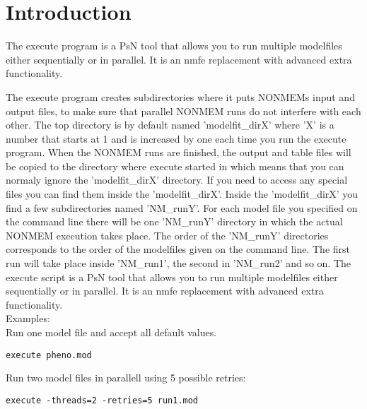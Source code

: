 




\maketitle
\newcommand{\guidetoolname}{execute}


\section{Introduction}
The execute program is a PsN tool that allows you to run multiple modelfiles either sequentially or in parallel. 
It is an nmfe replacement with advanced extra functionality.

The execute program creates subdirectories where it puts NONMEMs input and output files, to make sure that parallel 
NONMEM runs do not interfere with each other. The top directory is by default named 'modelfit\_dirX' where 'X' is a 
number that starts at 1 and is increased by one each time you run the execute program. When the NONMEM runs are 
finished, the output and table files will be copied to the directory where execute started in which means that you can 
normaly ignore the 'modelfit\_dirX' directory. If you need to access any special files you can find them inside the  
'modelfit\_dirX'. Inside the 'modelfit\_dirX' you find a few subdirectories named 'NM\_runY'. For each model file you 
specified on the command line there will be one 'NM\_runY' directory in which the actual NONMEM execution takes place. 
The order of the 'NM\_runY' directories corresponds to the order of the modelfiles given on the command line. The first run 
will take place inside 'NM\_run1', the second in 'NM\_run2' and so on. The execute script is a PsN tool that allows you to run 
multiple modelfiles either sequentially or in parallel. It is an nmfe replacement with advanced extra functionality.\\
Examples:\\
Run one model file and accept all default values.

\begin{verbatim}
execute pheno.mod
\end{verbatim}

Run two model files in parallell using 5 possible retries:

\begin{verbatim}
execute -threads=2 -retries=5 run1.mod 
\end{verbatim}

